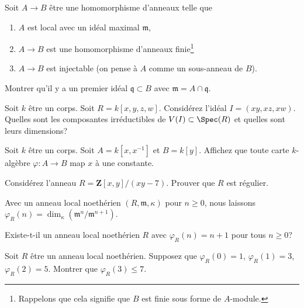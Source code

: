\begin{exercise}
\label{exercise-finite-injective}
Soit $A \to B$ être une homomorphisme d'anneaux telle que
\begin{enumerate}
\item $A$ est local avec un idéal maximal $\mathfrak m$,
\item $A \to B$ est une homomorphisme d'anneaux finie\footnote{Rappelons que cela signifie
que $B$ est finie sous forme de $A$-module.}
\item $A \to B$ est injectable (on pense à $A$ comme un sous-anneau de $B$).
\end{enumerate}
Montrer qu'il y a un premier idéal $\mathfrak q \subset B$ avec
$\mathfrak m = A \cap \mathfrak q$.
\end{exercise}

\begin{exercise}
\label{exercise-find-components}
Soit $k$ être un corps. Soit $R =
k[x, y, z, w]$. Considérez l'idéal $I =
(xy, xz, xw)$. Quelles sont les composantes
irréductibles de $V(I) \subset \Spec(R)$ et quelles sont leurs dimensions?
\end{exercise}

\begin{exercise}
\label{exercise-no-nonconstant-morphism}
Soit $k$ être un corps. Soit $A = k[x, x^{-1}]$ et $B =
k[y]$. Affichez que toute carte $k$-algèbre $\varphi : A \to B$ map $x$ à une constante.
\end{exercise}

\begin{exercise}
\label{exercise-regular-over-Z}
Considérez l'anneau $R = \mathbf{Z}[x, y]/(xy - 7)$. Prouver
que $R$ est régulier.
\end{exercise}

\noindent
Avec un anneau local noethérien $(R, \mathfrak m, \kappa)$
pour $n \geq
0$, nous laissons $\varphi_R(n) = \dim_\kappa(\mathfrak m^n/\mathfrak m^{n + 1})$.

\begin{exercise}
\label{exercise-hilbert-function-allowed}
Existe-t-il un anneau local noethérien $R$ avec $\varphi_R(n) =
n + 1$ pour tous $n \geq 0$?
\end{exercise}

\begin{exercise}
\label{exercise-hilbert-function-prohibited}
Soit $R$ être un anneau local
noethérien. Supposez que $\varphi_R(0) = 1$, $\varphi_R(1) =
3$, $\varphi_R(2) = 5$. Montrer que $\varphi_R(3) \leq 7$.
\end{exercise}





